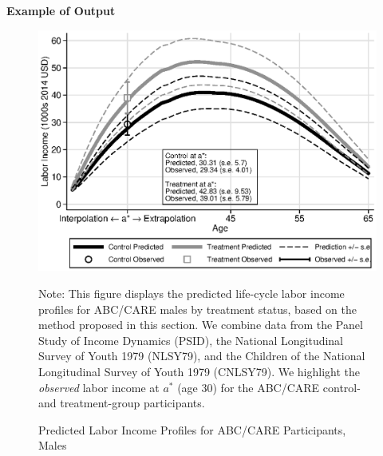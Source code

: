\documentclass[static]{JJH-Beamer}
\begin{document}
\begin{frame}

\begin{center}
\textbf{Example of Output}
\end{center}

\begin{figure}[H]
\caption{Predicted Labor Income Profiles for ABC/CARE Participants, Males}\label{fig:labor-income-profilesc}
\begin{center}
\includegraphics[width=.55\textwidth]{output/labor_25-65_pset1_mset3_male.eps}
\end{center}
\tiny \flushleft Note: This figure displays the predicted life-cycle labor income profiles for ABC/CARE males by treatment status, based on the method proposed in this section. We combine data from the Panel Study of Income Dynamics (PSID), the National Longitudinal Survey of Youth 1979 (NLSY79), and the Children of the National Longitudinal Survey of Youth 1979 (CNLSY79). We highlight the \textit{observed} labor income at $a^*$ (age 30) for the ABC/CARE control- and treatment-group participants.\\
\end{figure}

\end{frame}
\end{document}
